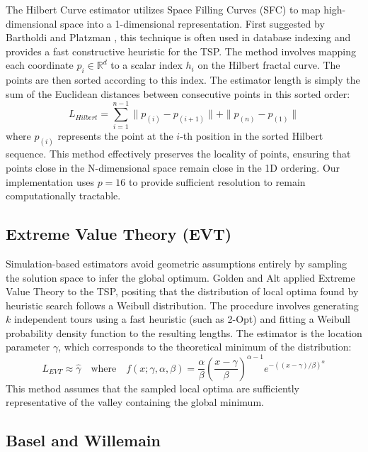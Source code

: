 \documentclass{article}
\begin{document}
The Hilbert Curve estimator utilizes Space Filling Curves (SFC) to map high-dimensional space into a 1-dimensional representation. First suggested by Bartholdi and Platzman \cite{bartholdi1982n}, this technique is often used in database indexing and provides a fast constructive heuristic for the TSP. The method involves mapping each coordinate $p_i \in \mathbb{R}^d$ to a scalar index $h_i$ on the Hilbert fractal curve. The points are then sorted according to this index. The estimator length is simply the sum of the Euclidean distances between consecutive points in this sorted order:
\begin{equation}
L_{Hilbert} = \sum_{i=1}^{n-1} \|p_{(i)} - p_{(i+1)}\| + \|p_{(n)} - p_{(1)}\|
\end{equation}
where $p_{(i)}$ represents the point at the $i$-th position in the sorted Hilbert sequence. This method effectively preserves the locality of points, ensuring that points close in the N-dimensional space remain close in the 1D ordering. Our implementation uses $p=16$ to provide sufficient resolution to remain computationally tractable.

\subsection{Extreme Value Theory (EVT)}

Simulation-based estimators avoid geometric assumptions entirely by sampling the solution space to infer the global optimum. Golden and Alt \cite{evt_tsp} applied Extreme Value Theory to the TSP, positing that the distribution of local optima found by heuristic search follows a Weibull distribution. The procedure involves generating $k$ independent tours using a fast heuristic (such as 2-Opt) and fitting a Weibull probability density function to the resulting lengths. The estimator is the location parameter $\gamma$, which corresponds to the theoretical minimum of the distribution:
\begin{equation}
L_{EVT} \approx \hat{\gamma} \quad \text{where} \quad f(x; \gamma, \alpha, \beta) = \frac{\alpha}{\beta} \left( \frac{x-\gamma}{\beta} \right)^{\alpha-1} e^{-((x-\gamma)/\beta)^\alpha}
\end{equation}
This method assumes that the sampled local optima are sufficiently representative of the valley containing the global minimum.

\subsection{Basel and Willemain}
\end{document}
